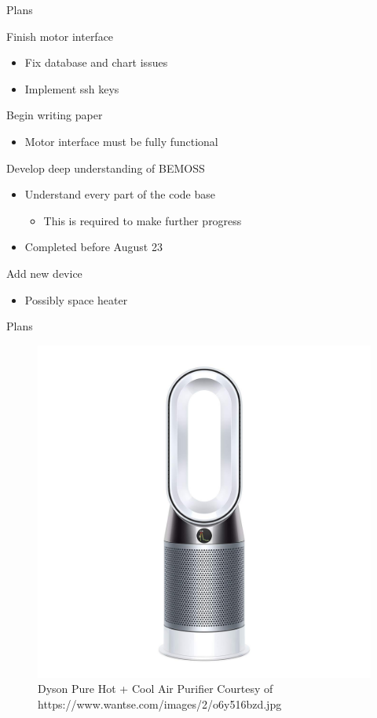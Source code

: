 \documentclass{beamer}
\begin{document}
\begin{frame}{Plans}
\begin{block}{Finish motor interface}
\begin{itemize}
\item Fix database and chart issues
\item Implement ssh keys
\end{itemize}
\end{block}
\begin{block}{Begin writing paper}
\begin{itemize}
	\item Motor interface must be fully functional
\end{itemize}
\end{block}
\begin{block}{Develop deep understanding of BEMOSS}
	\begin{itemize}
		\item Understand every part of the code base
		\begin{itemize}
			\item This is required to make further progress
		\end{itemize}
		\item Completed before August 23
	\end{itemize}
\end{block}
\begin{block}{Add new device}
\begin{itemize}
\item Possibly space heater
\end{itemize}
\end{block}
\end{frame}
\begin{frame}{Plans}
\begin{figure}
	\centering
	\includegraphics[scale=0.11]{figs/dysonairpurifier.jpg}
	\caption{Dyson Pure Hot + Cool Air Purifier Courtesy of https://www.wantse.com/images/2/o6y516bzd.jpg}
\end{figure}
\end{frame}
\end{document}
